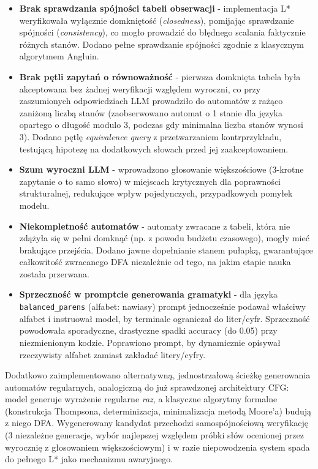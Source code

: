 \documentclass[12pt]{article}
\begin{document}
\begin{itemize}
    \item \textbf{Brak sprawdzania spójności tabeli obserwacji} - implementacja L* weryfikowała wyłącznie domkniętość (\emph{closedness}), pomijając sprawdzanie spójności (\emph{consistency}), co mogło prowadzić do błędnego scalania faktycznie różnych stanów. Dodano pełne sprawdzanie spójności zgodnie z klasycznym algorytmem Angluin.
    \item \textbf{Brak pętli zapytań o równoważność} - pierwsza domknięta tabela była akceptowana bez żadnej weryfikacji względem wyroczni, co przy zaszumionych odpowiedziach LLM prowadziło do automatów z rażąco zaniżoną liczbą stanów (zaobserwowano automat o 1 stanie dla języka opartego o długość modulo 3, podczas gdy minimalna liczba stanów wynosi 3). Dodano pętlę \emph{equivalence query} z przetwarzaniem kontrprzykładu, testującą hipotezę na dodatkowych słowach przed jej zaakceptowaniem.
    \item \textbf{Szum wyroczni LLM} - wprowadzono głosowanie większościowe (3-krotne zapytanie o to samo słowo) w miejscach krytycznych dla poprawności strukturalnej, redukujące wpływ pojedynczych, przypadkowych pomyłek modelu.
    \item \textbf{Niekompletność automatów} - automaty zwracane z tabeli, która nie zdążyła się w pełni domknąć (np. z powodu budżetu czasowego), mogły mieć brakujące przejścia. Dodano jawne dopełnianie stanem pułapką, gwarantujące całkowitość zwracanego DFA niezależnie od tego, na jakim etapie nauka została przerwana.
    \item \textbf{Sprzeczność w promptcie generowania gramatyki} - dla języka \texttt{balanced\_parens} (alfabet: nawiasy) prompt jednocześnie podawał właściwy alfabet i instruował model, by terminale ograniczał do liter/cyfr. Sprzeczność powodowała sporadyczne, drastyczne spadki accuracy (do 0.05) przy niezmienionym kodzie. Poprawiono prompt, by dynamicznie opisywał rzeczywisty alfabet zamiast zakładać litery/cyfry.
\end{itemize}

Dodatkowo zaimplementowano alternatywną, jednostrzałową ścieżkę generowania automatów regularnych, analogiczną do już sprawdzonej architektury CFG: model generuje wyrażenie regularne \emph{raz}, a klasyczne algorytmy formalne (konstrukcja Thompsona, determinizacja, minimalizacja metodą Moore'a) budują z niego DFA. Wygenerowany kandydat przechodzi samospójnościową weryfikację (3 niezależne generacje, wybór najlepszej względem próbki słów ocenionej przez wyrocznię z głosowaniem większościowym) i w razie niepowodzenia system spada do pełnego L* jako mechanizmu awaryjnego.
\end{document}
